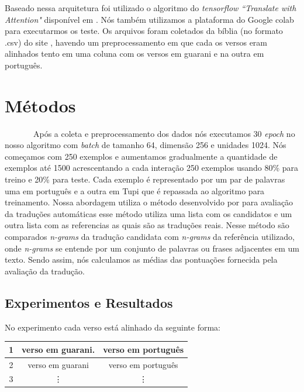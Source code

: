 \documentclass[12pt]{article}
\begin{document}
Baseado nessa arquitetura foi  utilizado o algoritmo do \textit{tensorflow ``Translate with Attention"} disponível em \cite{tensorflow}. Nós também utilizamos a plataforma do Google colab \cite{google} para executarmos os teste.
Os arquivos foram coletados da bíblia (no formato .csv) do site \cite{angelo}, havendo um preprocessamento em que cada os versos eram alinhados tento em uma coluna com os versos em guarani e na outra em português.

\section{Métodos}

~~~~~~~Após a coleta e preprocessamento dos dados nós executamos 30 \textit{epoch} no nosso algoritmo com \textit{batch} de tamanho 64, dimensão 256 e unidades 1024. Nós começamos com 250 exemplos e aumentamos gradualmente a quantidade de exemplos até 1500 acrescentando a cada interação 250 exemplos usando 80\% para treino e 20\% para teste. Cada exemplo é representado por um par de palavras uma em português e a outra em Tupi que é repassada ao algoritmo para treinamento. Nossa abordagem utiliza o método desenvolvido por \cite{papineni2002bleu} para avaliação da traduções automáticas esse método utiliza uma lista com os candidatos e um outra lista com as referencias as quais são as traduções reais. Nesse método são comparados \textit{n-grams}
da tradução candidata com \textit{n-grams} da referência utilizado, onde \textit{n-grams} se entende por um conjunto de palavras ou frases adjacentes em um texto. Sendo assim, nós calculamos as médias das pontuações fornecida pela avaliação da tradução.

\subsection{Experimentos e Resultados}

No experimento cada verso está alinhado da seguinte forma:

\begin{center}
 \begin{tabular}{||c c c ||} 
 \hline
 1 & verso em guarani. & verso em português \\ [0.5ex] 
 \hline
 2 & verso em guarani & verso em português \\ 
 \hline
 3 & \vdots & \vdots  \\
 \hline
\end{tabular}
\end{center}
\end{document}
